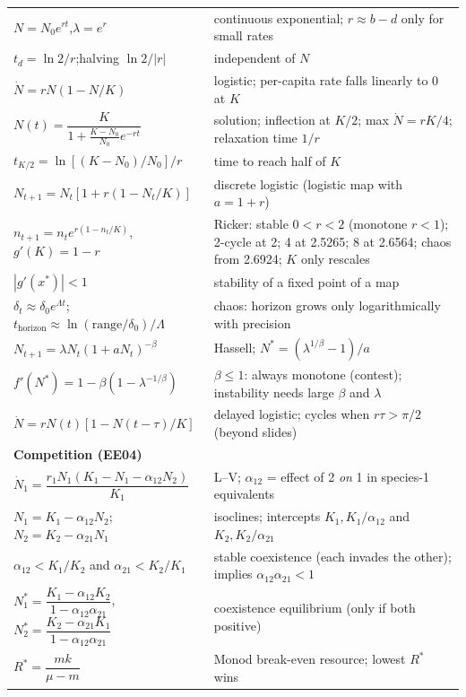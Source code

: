 {\begin{longtable}{p{}p{}}
$N=N_0e^{rt}$,\quad $\lambda=e^r$ & continuous exponential; $r\approx b-d$ only for small rates\\
$t_d=\ln2/r$;\quad halving $\ln2/|r|$ & independent of $N$\\
$\dot N=rN(1-N/K)$ & logistic; per-capita rate falls linearly to 0 at $K$\\
$N(t)=\dfrac{K}{1+\frac{K-N_0}{N_0}e^{-rt}}$ & solution; inflection at $K/2$; max $\dot N=rK/4$; relaxation time $1/r$\\
$t_{K/2}=\ln[(K-N_0)/N_0]/r$ & time to reach half of $K$\\
$N_{t+1}=N_t[1+r(1-N_t/K)]$ & discrete logistic (logistic map with $a=1+r$)\\
$n_{t+1}=n_te^{r(1-n_t/K)}$,\quad $g'(K)=1-r$ & Ricker: stable $0<r<2$ (monotone $r<1$); 2-cycle at 2; 4 at 2.5265; 8 at 2.6564; chaos from 2.6924; $K$ only rescales\\
$|g'(x^*)|<1$ & stability of a fixed point of a map\\
$\delta_t\approx\delta_0e^{\Lambda t}$;\quad $t_{\text{horizon}}\approx\ln(\text{range}/\delta_0)/\Lambda$ & chaos: horizon grows only logarithmically with precision\\
$N_{t+1}=\lambda N_t(1+aN_t)^{-\beta}$ & Hassell; $N^*=(\lambda^{1/\beta}-1)/a$\\
$f'(N^*)=1-\beta(1-\lambda^{-1/\beta})$ & $\beta\le1$: always monotone (contest); instability needs large $\beta$ and $\lambda$\\
$\dot N=rN(t)[1-N(t-\tau)/K]$ & delayed logistic; cycles when $r\tau>\pi/2$ (beyond slides)\\
\midrule
\multicolumn{2}{l}{\textbf{Competition (EE04)}}\\
$\dot N_1=\dfrac{r_1N_1(K_1-N_1-\alpha_{12}N_2)}{K_1}$ & L--V; $\alpha_{12}$ = effect of 2 \emph{on} 1 in species-1 equivalents\\
$N_1=K_1-\alpha_{12}N_2$;\ $N_2=K_2-\alpha_{21}N_1$ & isoclines; intercepts $K_1, K_1/\alpha_{12}$ and $K_2, K_2/\alpha_{21}$\\
$\alpha_{12}<K_1/K_2$ and $\alpha_{21}<K_2/K_1$ & stable coexistence (each invades the other); implies $\alpha_{12}\alpha_{21}<1$\\
$N_1^*=\dfrac{K_1-\alpha_{12}K_2}{1-\alpha_{12}\alpha_{21}}$,\ $N_2^*=\dfrac{K_2-\alpha_{21}K_1}{1-\alpha_{12}\alpha_{21}}$ & coexistence equilibrium (only if both positive)\\
$R^*=\dfrac{mk}{\mu-m}$ & Monod break-even resource; lowest $R^*$ wins\\

\end{longtable}}
